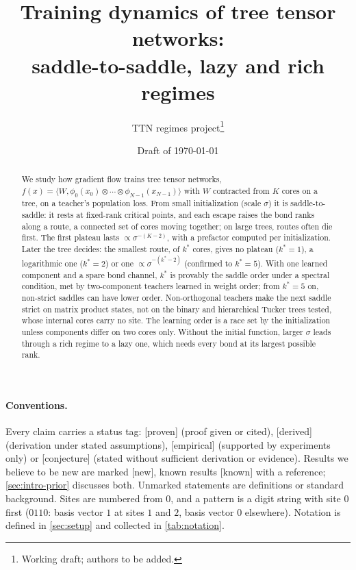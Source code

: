 \documentclass[11pt,letterpaper]{article}
\title{Training dynamics of tree tensor networks:\\
       saddle-to-saddle, lazy and rich regimes}
\author{TTN regimes project\thanks{Working draft; authors to be added.}}
\date{Draft of \today}
\theoremstyle{plain}
\theoremstyle{definition}
\theoremstyle{remark}
\newcommand{\statustag}[2]{%
  {\setlength{\fboxsep}{1.1pt}\setlength{\fboxrule}{0.4pt}%
   \fcolorbox{#1}{#1!7}{\textcolor{#1}{\sffamily\scriptsize\bfseries #2}}}}
\newcommand{\tagnote}[1]{\if\relax\detokenize{#1}\relax\else\,{\upshape\small(#1)}\fi}
\DeclareRobustCommand{\proven}{\statustag{tagproven}{proven}}
\DeclareRobustCommand{\derived}{\statustag{tagderived}{derived}}
\DeclareRobustCommand{\empirical}{\statustag{tagempirical}{empirical}}
\DeclareRobustCommand{\conjecturetag}{\statustag{tagconjecture}{conjecture}}
\DeclareRobustCommand{\newresult}[1][]{\statustag{tagnew}{new}\tagnote{#1}}
\DeclareRobustCommand{\knownresult}[1][]{\statustag{tagknown}{known}\tagnote{#1}}
\let\conjecture\conjecturetag
\def\conjecture{\let\conjecture\conjecturetag\conjectureenv}%
\def\proven{[proven]}\def\derived{[derived]}\def\empirical{[empirical]}%
\def\conjecture{[conjecture]}\def\newresult{[new]}\def\knownresult{[known]}}
\begin{document}
\maketitle

\begin{abstract}
  \sloppy
  We study how gradient flow trains tree tensor networks,
  $f(x)=\langle W,\phi_0(x_0)\otimes\cdots\otimes\phi_{N-1}(x_{N-1})\rangle$ with $W$ contracted from $K$ cores on a
  tree, on a teacher's population loss. From small initialization (scale $\sigma$) it is
  saddle-to-saddle: it rests at fixed-rank critical points, and each escape raises the bond ranks along a
  route, a connected set of cores moving together; on large trees, routes often die first. The first
  plateau lasts $\propto\sigma^{-(K-2)}$, with a prefactor computed per initialization. Later the tree decides:
  the smallest route, of $k^*$ cores, gives no plateau ($k^*=1$), a logarithmic one ($k^*=2$) or one
  $\propto\sigma^{-(k^*-2)}$ (confirmed to $k^*=5$). With one learned component and a spare bond channel,
  $k^*$ is provably the saddle order under a spectral condition, met by two-component teachers learned in
  weight order; from $k^*=5$ on, non-strict saddles can have lower order. Non-orthogonal teachers make the next
  saddle strict on matrix product states, not on the binary and hierarchical Tucker trees tested, whose
  internal cores carry no site. The learning order is a race set by the initialization unless components
  differ on two cores only. Without the initial function, larger $\sigma$ leads through a rich regime to a
  lazy one, which needs every bond at its largest possible rank.
\end{abstract}

\tableofcontents

\paragraph{Conventions.}
Every claim carries a status tag: \proven{} (proof given or cited), \derived{} (derivation
under stated assumptions), \empirical{} (supported by experiments only) or \conjecture{} (stated
without sufficient derivation or evidence). Results we believe to be new are marked \newresult{},
known results \knownresult{} with a reference; \cref{sec:intro-prior} discusses both. Unmarked
statements are definitions or standard background. Sites are numbered from $0$, and a pattern is a
digit string with site $0$ first ($0110$: basis vector $1$ at sites $1$ and $2$, basis vector $0$
elsewhere). Notation is defined in \cref{sec:setup} and collected in \cref{tab:notation}.
\end{document}
